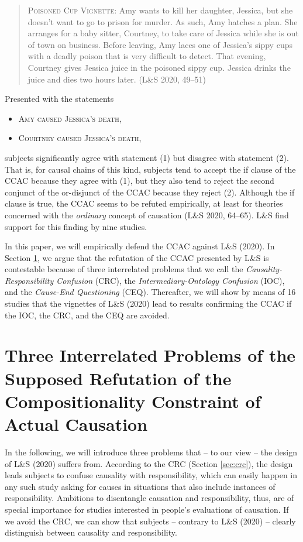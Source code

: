 \documentclass[egregdoesnotlikesansseriftitles,12pt]{scrartcl}
\begin{document}
\begin{quote}
   \textsc{Poisoned Cup Vignette:} Amy wants to kill her daughter, Jessica, but she doesn't want to go to prison for murder. As such, Amy hatches a plan. She arranges for a baby sitter, Courtney, to take care of Jessica while she is out of town on business. Before leaving, Amy laces one of Jessica's sippy cups with a deadly poison that is very difficult to detect. That evening, Courtney gives Jessica juice in the poisoned sippy cup. Jessica drinks the juice and dies two hours later. (L\&S 2020, 49--51)
\end{quote}

\noindent Presented with the statements

\begin{itemize}
   \item[(1)]\textsc{Amy caused Jessica's death,}
   \item[(2)]\textsc{Courtney caused Jessica's death,}
\end{itemize}

\noindent subjects significantly agree with statement (1) but disagree with statement (2). That is, for causal chains of this kind, subjects tend to accept the if clause of the CCAC because they agree with (1), but they also tend to reject the second conjunct of the or-disjunct of the CCAC because they reject (2). Although the if clause is true, the CCAC seems to be refuted empirically, at least for theories concerned with the \textit{ordinary} concept of causation (L\&S 2020, 64--65). L\&S find support for this finding by nine studies.

In this paper, we will empirically defend the CCAC against L\&S (2020). In Section \ref{sec:theory}, we argue that the refutation of the CCAC presented by L\&S is contestable because of three interrelated problems that we call the \textit{Causality-Responsibility Confusion} (CRC), the \textit{Intermediary-Ontology Confusion} (IOC), and the \textit{Cause-End Questioning} (CEQ). Thereafter, we will show by means of 16 studies that the vignettes of L\&S (2020) lead to results confirming the CCAC if the IOC, the CRC, and the CEQ are avoided.

\section{Three Interrelated Problems of the Supposed Refutation of the Compositionality Constraint of Actual Causation}\label{sec:theory}
In the following, we will introduce three problems that -- to our view -- the design of L\&S (2020) suffers from. According to the CRC (Section \ref{sec:crc}), the design leads subjects to confuse causality with responsibility, which can easily happen in any such study asking for causes in situations that also include instances of responsibility. Ambitions to disentangle causation and responsibility, thus, are of special importance for studies interested in people's evaluations of causation. If we avoid the CRC, we can show that subjects -- contrary to L\&S (2020) -- clearly distinguish between causality and responsibility.
\end{document}
